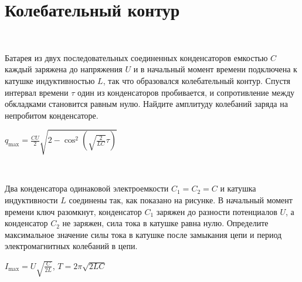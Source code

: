 \section{Колебательный контур}

\begin{ex}
\hspace{0pt} \\
\begin{minipage}{.65\textwidth}
Батарея из двух последовательных соединенных конденсаторов емкостью $C$ каждый заряжена до напряжения $U$ и в начальный момент времени подключена к катушке индуктивностью $L$, так что образовался колебательный контур. 
Спустя интервал времени $\tau$ один из конденсаторов пробивается, и сопротивление между обкладками становится равным нулю. 
Найдите амплитуду колебаний заряда на непробитом конденсаторе.
\end{minipage}
\begin{minipage}{.35\textwidth}
\centering

\end{minipage}
\begin{ans}
$q_{\max} = \frac{CU}{2}\sqrt{2-\cos^2 \left( \sqrt{\frac{2}{LC}} \tau \right)}$
\end{ans}
\end{ex}

\begin{ex}
\hspace{0pt} \\
\begin{minipage}{.65\textwidth}
 Два конденсатора одинаковой электроемкости $C_1 = C_2 = C$ и катушка индуктивности $L$ соединены так, как показано на рисунке. 
В начальный момент времени ключ разомкнут, конденсатор $C_1$ заряжен до разности потенциалов $U$, а конденсатор $C_2$ не заряжен, 
сила тока в катушке равна нулю. Определите максимальное значение силы тока в катушке после замыкания цепи и период электромагнитных колебаний в цепи. 
\end{minipage}
\begin{minipage}{.35\textwidth}
\centering

\end{minipage}
\begin{ans}
$I_{\max} = U \sqrt{\frac{C}{2L}}$, $T=2 \pi \sqrt{2LC}$
\end{ans}
\end{ex}

